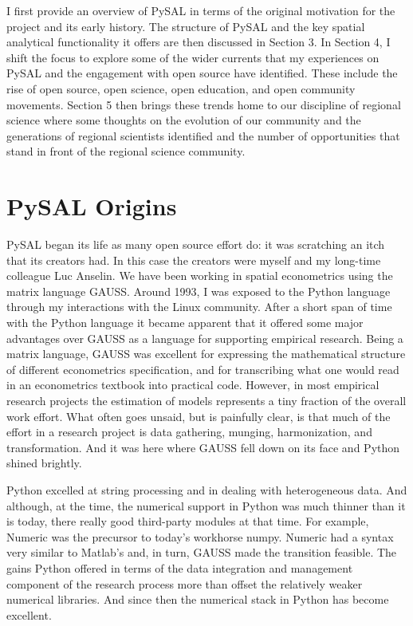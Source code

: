 \documentclass[11pt]{article}
\begin{document}
I first provide an overview of PySAL in terms of the original motivation for
the project and its early history. The structure of PySAL and the key spatial
analytical functionality it offers are then discussed in Section 3. In Section
4, I shift the focus to explore some of the wider currents that my experiences
on PySAL and the engagement with open source have identified. These include the
rise of open source, open science, open education, and open community
movements. Section 5 then brings these trends home to our discipline of
regional science where some thoughts on the evolution of our community and the
generations of regional scientists identified and the number of opportunities
that stand in front of the regional science community.

\section{PySAL Origins}
\label{sec:org5c752ab}
PySAL began its life as many open source effort do: it was scratching
an itch that its creators had. In this case the creators were myself and my
long-time colleague Luc Anselin. We have been working in spatial econometrics
using the matrix language GAUSS. Around 1993, I was exposed to the Python
language through my interactions with the Linux community. After a short span of
time with the Python language it became apparent that it offered some major
advantages over GAUSS as a language for supporting empirical research. Being a
matrix language, GAUSS was excellent for expressing the mathematical structure
of different econometrics specification, and for transcribing what one would
read in an econometrics textbook into practical code. However, in most empirical
research projects the estimation of models represents a tiny fraction of the
overall work effort. What often goes unsaid, but is painfully clear, is that
much of the effort in a research project is data gathering, munging,
harmonization, and transformation. And it was here where GAUSS fell down on its
face and Python shined brightly.

Python excelled at string processing and in dealing with heterogeneous data.
And although, at the time, the numerical support in Python was much thinner
than it is today, there really good third-party modules at that time. For
example, Numeric was the precursor to today's workhorse numpy. Numeric had a
syntax very similar to Matlab's and, in turn, GAUSS made the transition
feasible. The gains Python offered in terms of the data integration and management
component of the research process more than offset the relatively weaker
numerical libraries. And since then the numerical stack in Python has become
excellent.
\end{document}
